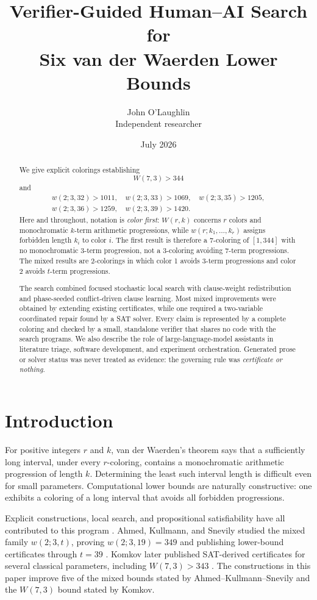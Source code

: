 \documentclass[11pt]{article}
\title{Verifier-Guided Human--AI Search for\\
Six van der Waerden Lower Bounds}
\author{John O'Laughlin\\
\small Independent researcher}
\date{July 2026}
\newcommand{\interval}[1]{[1,#1]}
\begin{document}
\maketitle

\begin{abstract}
We give explicit colorings establishing
\[
  W(7,3)>344
\]
and
\[
\begin{gathered}
  w(2;3,32)>1011,\quad w(2;3,33)>1069,\quad w(2;3,35)>1205,\\
  w(2;3,36)>1259,\quad w(2;3,39)>1420.
\end{gathered}
\]
Here and throughout, notation is \emph{color first}: \(W(r,k)\) concerns
\(r\) colors and monochromatic \(k\)-term arithmetic progressions, while
\(w(r;k_1,\ldots,k_r)\) assigns forbidden length \(k_i\) to color \(i\).
The first result is therefore a 7-coloring of \(\interval{344}\) with no
monochromatic 3-term progression, not a 3-coloring avoiding 7-term
progressions.  The mixed results are 2-colorings in which color 1 avoids
3-term progressions and color 2 avoids \(t\)-term progressions.

The search combined focused stochastic local search with clause-weight
redistribution and phase-seeded conflict-driven clause learning.  Most mixed
improvements were obtained by extending existing certificates, while one
required a two-variable coordinated repair found by a SAT solver.  Every
claim is represented by a complete coloring and checked by a small,
standalone verifier that shares no code with the search programs.  We also
describe the role of large-language-model assistants in literature triage,
software development, and experiment orchestration.  Generated prose or
solver status was never treated as evidence: the governing rule was
\emph{certificate or nothing}.
\end{abstract}

\section{Introduction}

For positive integers \(r\) and \(k\), van der Waerden's theorem says that a
sufficiently long interval, under every \(r\)-coloring, contains a
monochromatic arithmetic progression of length \(k\).  Determining the least
such interval length is difficult even for small parameters.  Computational
lower bounds are naturally constructive: one exhibits a coloring of a long
interval that avoids all forbidden progressions.

Explicit constructions, local search, and propositional satisfiability have
all contributed to this program
\cite{herwig2007,ahmed2014,heule2017,monroe2022,komkov2020}.  Ahmed, Kullmann,
and Snevily studied the mixed family \(w(2;3,t)\), proving
\(w(2;3,19)=349\) and publishing lower-bound certificates through \(t=39\)
\cite{ahmed2014}.  Komkov later published SAT-derived certificates for
several classical parameters, including \(W(7,3)>343\)
\cite{komkov2020}.  The constructions in this paper improve five of the
mixed bounds stated by Ahmed--Kullmann--Snevily and the \(W(7,3)\) bound
stated by Komkov.
\end{document}
